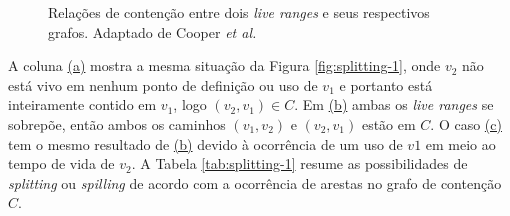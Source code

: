 \documentclass[
	12pt,				%
	openright,			%
	twoside,			%
	a4paper,			%
	tcc,			%
	]{ABNT-DC-UEL}
\begin{document}
\begin{figure}[ht]
\begin{subfigure}[b]{0.3\textwidth}
        \caption{}
        \label{fig:splitting-2:a}
    \end{subfigure}
    \begin{subfigure}[b]{0.3\textwidth}
        \centering
        \caption{}
        \label{fig:splitting-2:b}
    \end{subfigure}
    \begin{subfigure}[b]{0.3\textwidth}
        \centering
        \caption{}
        \label{fig:splitting-2:c}
    \end{subfigure}
    \caption{Relações de contenção entre dois \textit{live ranges} e seus respectivos grafos. Adaptado de Cooper \textit{et al.} \cite{cooper:98}}
    \label{fig:splitting-2}
\end{figure}

A coluna \hyperref[fig:splitting-2:a]{(a)} mostra a mesma situação da Figura \ref{fig:splitting-1}, onde $v_2$ não está vivo em nenhum ponto de definição ou uso de $v_1$ e portanto está inteiramente contido em $v_1$, logo $(v_2,v_1) \in C$. Em \hyperref[fig:splitting-2:b]{(b)} ambas os \textit{live ranges} se sobrepõe, então ambos os caminhos $(v_1,v_2)$ e $(v_2,v_1)$ estão em $C$. O caso \hyperref[fig:splitting-2:c]{(c)} tem o mesmo resultado de \hyperref[fig:splitting-2:b]{(b)} devido à ocorrência de um uso de $v1$ em meio ao tempo de vida de $v_2$. A Tabela \ref{tab:splitting-1} resume as possibilidades de \textit{splitting} ou \textit{spilling} de acordo com a ocorrência de arestas no grafo de contenção $C$.
\end{document}

